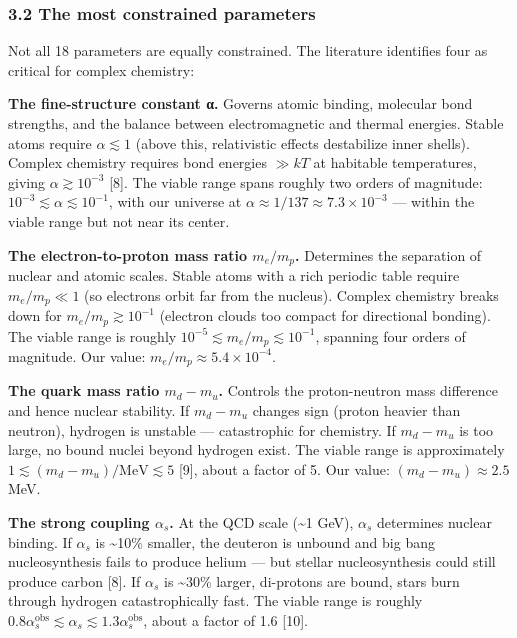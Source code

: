 \documentclass[
]{article}
\begin{document}
\hypertarget{the-most-constrained-parameters}{%
\subsubsection{3.2 The most constrained
parameters}\label{the-most-constrained-parameters}}

Not all 18 parameters are equally constrained. The literature identifies
four as critical for complex chemistry:

\textbf{The fine-structure constant α.} Governs atomic binding,
molecular bond strengths, and the balance between electromagnetic and
thermal energies. Stable atoms require \(\alpha \lesssim 1\) (above
this, relativistic effects destabilize inner shells). Complex chemistry
requires bond energies \(\gg kT\) at habitable temperatures, giving
\(\alpha \gtrsim 10^{-3}\) {[}8{]}. The viable range spans roughly two
orders of magnitude: \(10^{-3} \lesssim \alpha \lesssim 10^{-1}\), with
our universe at \(\alpha \approx 1/137 \approx 7.3 \times 10^{-3}\) ---
within the viable range but not near its center.

\textbf{The electron-to-proton mass ratio \(m_e / m_p\).} Determines the
separation of nuclear and atomic scales. Stable atoms with a rich
periodic table require \(m_e / m_p \ll 1\) (so electrons orbit far from
the nucleus). Complex chemistry breaks down for
\(m_e / m_p \gtrsim 10^{-1}\) (electron clouds too compact for
directional bonding). The viable range is roughly
\(10^{-5} \lesssim m_e / m_p \lesssim 10^{-1}\), spanning four orders of
magnitude. Our value: \(m_e / m_p \approx 5.4 \times 10^{-4}\).

\textbf{The quark mass ratio \(m_d - m_u\).} Controls the proton-neutron
mass difference and hence nuclear stability. If \(m_d - m_u\) changes
sign (proton heavier than neutron), hydrogen is unstable ---
catastrophic for chemistry. If \(m_d - m_u\) is too large, no bound
nuclei beyond hydrogen exist. The viable range is approximately
\(1 \lesssim (m_d - m_u) / \text{MeV} \lesssim 5\) {[}9{]}, about a
factor of 5. Our value: \((m_d - m_u) \approx 2.5\) MeV.

\textbf{The strong coupling \(\alpha_s\).} At the QCD scale
(\textasciitilde1 GeV), \(\alpha_s\) determines nuclear binding. If
\(\alpha_s\) is \textasciitilde10\% smaller, the deuteron is unbound and
big bang nucleosynthesis fails to produce helium --- but stellar
nucleosynthesis could still produce carbon {[}8{]}. If \(\alpha_s\) is
\textasciitilde30\% larger, di-protons are bound, stars burn through
hydrogen catastrophically fast. The viable range is roughly
\(0.8 \alpha_s^{\text{obs}} \lesssim \alpha_s \lesssim 1.3 \alpha_s^{\text{obs}}\),
about a factor of 1.6 {[}10{]}.
\end{document}
